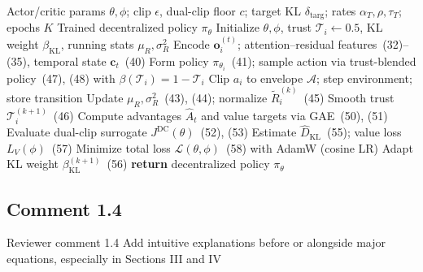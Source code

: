 \documentclass[11pt]{article}
\begin{document}
\begin{algorithm}[H]
\caption{ART-MAPPO Training for Cooperative Swarm Interception (CTDE)}
\begin{algorithmic}[1]
\REQUIRE Actor/critic params $\theta,\phi$; clip $\epsilon$, dual-clip floor $c$; target KL $\delta_{\mathrm{targ}}$; rates $\alpha_T,\rho,\tau_T$; epochs $K$
\ENSURE Trained decentralized policy $\pi_{\theta}$
\STATE Initialize $\theta,\phi$, trust $\mathcal{T}_i\!\leftarrow\!0.5$, KL weight $\beta_{\mathrm{KL}}$, running stats $\mu_R,\sigma_R^2$
    \STATE Encode $\mathbf{o}_i^{(t)}$; attention--residual features~(32)--(35), temporal state $\mathbf{c}_t$~(40)
    \STATE Form policy $\pi_{\theta_i}$~(41); sample action via trust-blended policy~(47), (48) with $\beta(\mathcal{T}_i)=1-\mathcal{T}_i$
    \STATE Clip $a_i$ to envelope $\mathcal{A}$; step environment; store transition
  \ENDFOR
  \STATE Update $\mu_R,\sigma_R^2$~(43), (44); normalize $\tilde{R}_i^{(k)}$~(45)
  \STATE Smooth trust $\mathcal{T}_i^{(k+1)}$~(46)
  \STATE Compute advantages $\hat{A}_t$ and value targets via GAE~(50), (51)
    \STATE Evaluate dual-clip surrogate $J^{\mathrm{DC}}(\theta)$~(52), (53)
    \STATE Estimate $\hat{D}_{\mathrm{KL}}$~(55); value loss $L_V(\phi)$~(57)
    \STATE Minimize total loss $\mathcal{L}(\theta,\phi)$~(58) with AdamW (cosine LR)
  \ENDFOR
  \STATE Adapt KL weight $\beta_{\mathrm{KL}}^{(k+1)}$~(56)
\ENDFOR
\STATE \textbf{return} decentralized policy $\pi_{\theta}$
\end{algorithmic}
\end{algorithm}



\subsection*{Comment 1.4 }

\begin{reviewercomment}{Reviewer comment 1.4}
Add intuitive explanations before or alongside major equations, especially in Sections III and IV

\end{reviewercomment}
\end{document}
